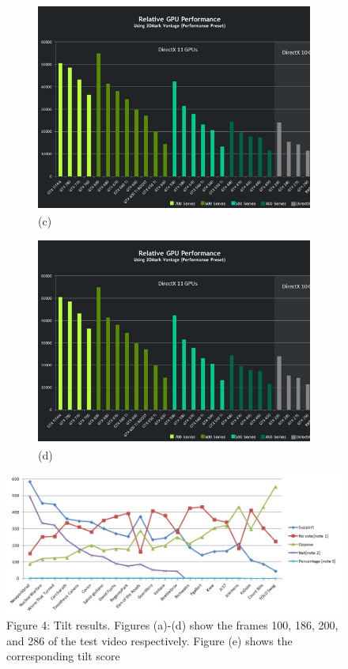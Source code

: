 \documentclass{IEEEtran}
\begin{document}
\begin{figure}[t!]
\begin{subfigure}[b]{0.2\linewidth}
    \includegraphics[width=\linewidth]{Performance.png}
    \caption{(c)}
  \end{subfigure}
  \begin{subfigure}[b]{0.2\linewidth}
    \includegraphics[width=\linewidth]{Performance.png}
    \caption{(d)}
  \end{subfigure}
  \includegraphics[width=\textwidth]{Graph_1.png}
  \caption{Figure 4: Tilt results. Figures (a)-(d) show the frames 100, 186,
200, and 286 of the test video respectively. Figure (e) shows the
corresponding tilt score}
\end{figure}
\end{document}
